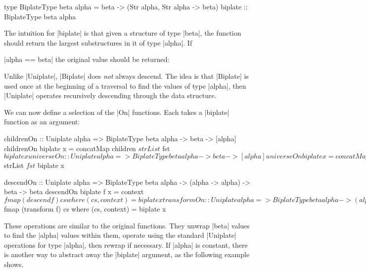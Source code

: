 \begin{comment}
\ignore\begin{code}
type BiplateType beta alpha = beta -> (Str alpha, Str alpha -> beta)
\end{code}
\end{comment}

\begin{code}
type BiplateType beta alpha = beta -> (Str alpha, Str alpha -> beta)
biplate :: BiplateType beta alpha
\end{code}

The intuition for |biplate| is that given a structure of type |beta|, the function should return the largest substructures in it of type |alpha|. If \ignore|alpha == beta| the original value should be returned:


Unlike |Uniplate|, |Biplate| does \textit{not} always descend. The idea is that |Biplate| is used once at the beginning of a traversal to find the values of type |alpha|, then |Uniplate| operates recursively descending through the data structure.

We can now define a selection of the |On| functions. Each takes a |biplate| function as an argument:

\begin{code}
childrenOn :: Uniplate alpha => BiplateType beta alpha -> beta -> [alpha]
childrenOn biplate x = concatMap children $ strList $ fst $ biplate x

universeOn :: Uniplate alpha => BiplateType beta alpha -> beta -> [alpha]
universeOn biplate x = concatMap universe $ strList $ fst $ biplate x

descendOn ::  Uniplate alpha => BiplateType beta alpha -> (alpha -> alpha) -> beta -> beta
descendOn biplate f x = context $ fmap (descend f) cs
    where (cs, context) = biplate x

transformOn :: Uniplate alpha => BiplateType beta alpha -> (alpha -> alpha) -> beta -> beta
transformOn biplate f x = context $ fmap (transform f) cs
    where (cs, context) = biplate x
\end{code}

These operations are similar to the original functions. They unwrap |beta| values to find the |alpha| values within them, operate using the standard |Uniplate| operations for type |alpha|, then rewrap if necessary. If |alpha| is constant, there is another way to abstract away the |biplate| argument, as the following example shows.

